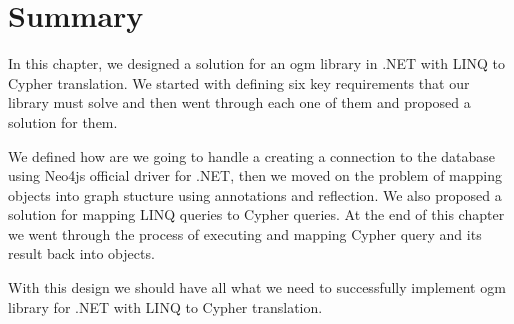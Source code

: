 \section{Summary}

In this chapter, we designed a solution for an \acrshort{ogm} library in .NET with LINQ to Cypher translation.
We started with defining six key requirements that our library must solve and then went through each one of them and
proposed a solution for them.

We defined how are we going to handle a creating a connection to the database using Neo4js official driver for .NET, then we moved on
the problem of mapping objects into graph stucture using annotations and reflection. We also proposed a solution for mapping LINQ queries to
Cypher queries. At the end of this chapter we went through the process of executing and mapping Cypher query and its result back into objects.

With this design we should have all what we need to successfully implement \acrshort{ogm} library for .NET with LINQ to Cypher translation.

